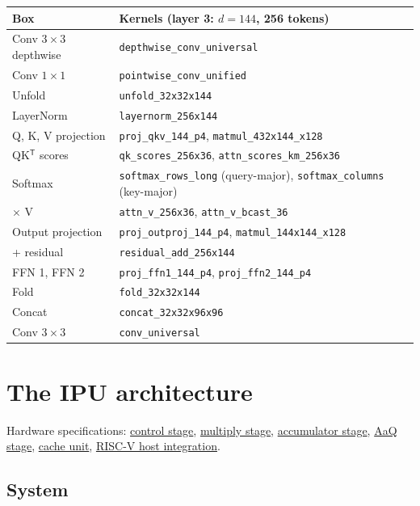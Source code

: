 \documentclass[11pt,a4paper]{article}
\renewcommand{\arraystretch}{1.2}
\newcommand{\doc}[2]{\href{https://rechefe.github.io/ipu-emulator/dev/#1/}{\textcolor{accent}{#2}}}
\begin{document}
\begin{center}
\footnotesize\renewcommand{\arraystretch}{1.0}
\begin{tabularx}{\linewidth}{lX}
\toprule
Box & Kernels (layer 3: $d=144$, 256 tokens) \\
\midrule
Conv $3\times3$ depthwise & \texttt{depthwise\_conv\_universal} \\
Conv $1\times1$ & \texttt{pointwise\_conv\_unified} \\
Unfold & \texttt{unfold\_32x32x144} \\
LayerNorm & \texttt{layernorm\_256x144} \\
Q, K, V projection & \texttt{proj\_qkv\_144\_p4}, \texttt{matmul\_432x144\_x128} \\
QK$^\mathsf{T}$ scores & \texttt{qk\_scores\_256x36}, \texttt{attn\_scores\_km\_256x36} \\
Softmax & \texttt{softmax\_rows\_long} (query-major), \texttt{softmax\_columns} (key-major) \\
$\times$ V & \texttt{attn\_v\_256x36}, \texttt{attn\_v\_bcast\_36} \\
Output projection & \texttt{proj\_outproj\_144\_p4}, \texttt{matmul\_144x144\_x128} \\
+ residual & \texttt{residual\_add\_256x144} \\
FFN 1, FFN 2 & \texttt{proj\_ffn1\_144\_p4}, \texttt{proj\_ffn2\_144\_p4} \\
Fold & \texttt{fold\_32x32x144} \\
Concat & \texttt{concat\_32x32x96x96} \\
Conv $3\times3$ & \texttt{conv\_universal} \\
\bottomrule
\end{tabularx}
\end{center}

\section{The IPU architecture}

Hardware specifications: \doc{specs/ARCH-stage-ctrl}{control stage},
\doc{specs/ARCH-stage-mult}{multiply stage}, \doc{specs/ARCH-stage-acc}{accumulator stage}, \doc{specs/ARCH-stage-aaq-str}{AaQ stage},
\doc{specs/cache-unit}{cache unit}, \doc{specs/riscv-host-integration}{RISC-V host integration}.

\subsection{System}
\end{document}

